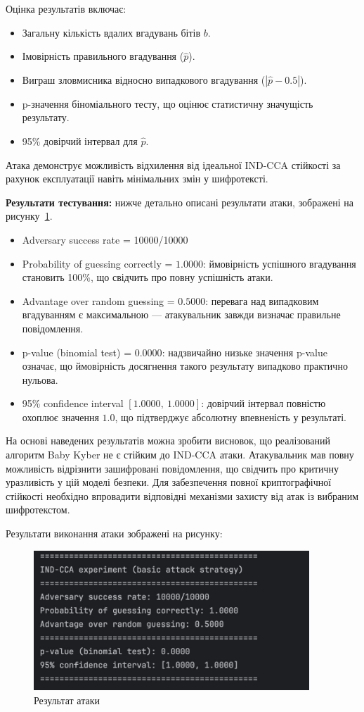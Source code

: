 Оцінка результатів включає:

\begin{itemize}
    \item Загальну кількість вдалих вгадувань бітів $b$.
    \item Імовірність правильного вгадування ($\hat{p}$).
    \item Виграш зловмисника відносно випадкового вгадування ($|\hat{p} - 0.5|$).
    \item p-значення біноміального тесту, що оцінює статистичну значущість результату.
    \item 95\% довірчий інтервал для $\hat{p}$.
\end{itemize}

Атака демонструє можливість відхилення від ідеальної IND-CCA стійкості за рахунок експлуатації навіть мінімальних змін у шифротексті. 

\textbf{Результати тестування:} нижче детально описані результати атаки, зображені на рисунку~\ref{fig:ind_cca_1}.

\begin{itemize}
    \item Adversary success rate = 10000/10000
    \item Probability of guessing correctly = $1.0000$: ймовірність успішного вгадування становить 100\%, що свідчить про повну успішність атаки.
    \item Advantage over random guessing = $0.5000$: перевага над випадковим вгадуванням є максимальною — атакувальник завжди визначає правильне повідомлення.
    \item p-value (binomial test) = $0.0000$: надзвичайно низьке значення p-value означає, що ймовірність досягнення такого результату випадково практично нульова.
    \item 95\% confidence interval $[1.0000,\ 1.0000]$: довірчий інтервал повністю охоплює значення $1.0$, що підтверджує абсолютну впевненість у результаті.
\end{itemize}

На основі наведених результатів можна зробити висновок, що реалізований алгоритм Baby Kyber не є стійким до IND-CCA атаки. Атакувальник мав повну можливість відрізнити зашифровані повідомлення, що свідчить про критичну уразливість у цій моделі безпеки. Для забезпечення повної криптографічної стійкості необхідно впровадити відповідні механізми захисту від атак із вибраним шифротекстом.

\newpage
Результати виконання атаки зображені на рисунку:

\begin{figure}[h]
    \centering
    \includegraphics[width=0.925\textwidth]{ПРАКТИКА/Images/IND_CCA_1.jpg}
    \caption{Результат атаки}
    \label{fig:ind_cca_1}
\end{figure}


